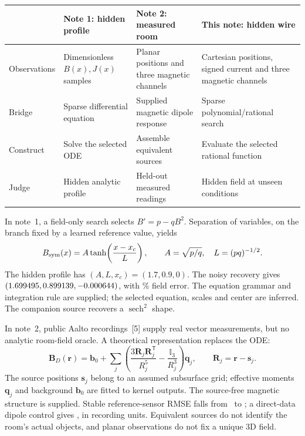 \documentclass[11pt,letterpaper]{article}
\newcommand{\sech}{\operatorname{sech}}
\begin{document}
\begin{center}
\small
\begin{tabular}{@{}>{\raggedright\arraybackslash}p{.16\linewidth}>{\raggedright\arraybackslash}p{.25\linewidth}>{\raggedright\arraybackslash}p{.25\linewidth}>{\raggedright\arraybackslash}p{.26\linewidth}@{}}
\toprule
& Note 1: hidden profile & Note 2: measured room & This note: hidden wire\\
\midrule
Observations & Dimensionless $B(x),J(x)$ samples & Planar positions and three magnetic channels & Cartesian positions, signed current and three magnetic channels\\[3pt]
Bridge & Sparse differential equation & Supplied magnetic dipole response & Sparse polynomial/rational search\\[3pt]
Construct & Solve the selected ODE & Assemble equivalent sources & Evaluate the selected rational function\\[3pt]
Judge & Hidden analytic profile & Held-out measured readings & Hidden field at unseen conditions\\
\bottomrule
\end{tabular}
\end{center}
\vspace{-4pt}

In note~1, a field-only search selects $B'=p-qB^2$. Separation of variables,
on the branch fixed by a learned reference value, yields
\begin{equation}
B_{\rm sym}(x)=A\tanh\!\left(\frac{x-x_c}{L}\right),\qquad
A=\sqrt{p/q},\quad L=(pq)^{-1/2}.
\label{eq:tanh}
\end{equation}
The hidden profile has $(A,L,x_c)=(1.7,0.9,0)$. The noisy recovery gives
$(1.699495,0.899139,-0.000644)$, with \TanhError\% field error.
The equation grammar and integration rule are supplied; the selected equation,
scales and center are inferred. The companion source recovers a $\sech^2$ shape.

In note~2, public Aalto recordings~[5] supply real vector measurements, but no
analytic room-field oracle. A theoretical representation replaces the ODE:
\begin{equation}
\mathbf B_D(\mathbf r)=\mathbf b_0+
\sum_j\left(\frac{3\mathbf R_j\mathbf R_j^{\mathsf T}}{R_j^5}
-\frac{\mathbb I_3}{R_j^3}\right)\mathbf q_j,
\qquad\mathbf R_j=\mathbf r-\mathbf s_j.
\label{eq:dipole}
\end{equation}
The source positions $\mathbf s_j$ belong to an assumed subsurface grid;
effective moments $\mathbf q_j$ and background $\mathbf b_0$ are fitted to kernel
outputs. The source-free magnetic structure is supplied. Stable reference-sensor
RMSE falls from \SensorKernel\ to \SensorEquation; a direct-data dipole control
gives \SensorDirect, in recording units. Equivalent sources do not identify the
room's actual objects, and planar observations do not fix a unique 3D field.
\end{document}
